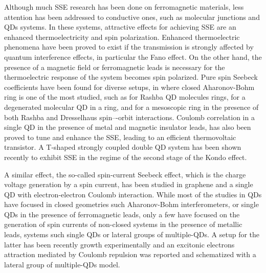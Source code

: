 \documentclass[aps,twocolumn,prb,superscript,floatfix,superscriptaddress,showpacs]{revtex4-1}
\begin{document}
Although much SSE research has been done on ferromagnetic materials, less attention has been addressed to conductive ones, such as molecular junctions and QDs systems.\cite{Karwacki2016,Sierra2016} In these systems, attractive effects for achieving SSE are an enhanced thermoelectricity and spin polarization. Enhanced thermoelectric phenomena have been proved to exist if the transmission is strongly affected by quantum interference effects,\cite{Bergfield2009,Finch2009,Stadler2011,GomezSilva2012,Lambert2015} in particular the Fano effect.\cite{Miroshnichenko2010} On the other hand, the presence of a magnetic field or ferromagnetic leads is necessary for the thermoelectric response of the system becomes spin polarized. Pure spin Seebeck coefficients have been found for diverse setups, in where closed Aharonov-Bohm ring is one of the most studied, such as for Rashba QD molecules rings, \cite{Liu2011,gomez2014} for a degenerated molecular QD in a ring,\cite{Jiang2015} and for a mesoscopic ring in the presence of both Rashba and Dresselhaus spin–-orbit interactions.\cite{Liu2016} Coulomb correlation in a single QD in the presence of metal and magnetic insulator leads, has also been proved to tune and enhance the SSE, leading to an efficient thermovoltaic transistor.\cite{Lei2016} A T-shaped strongly coupled double QD system has been shown recently to exhibit SSE in the regime of the second stage of the Kondo effect.\cite{Krzysztof2016}

A similar effect, the so-called spin-current Seebeck effect, which is the charge voltage generation by a spin current, has been studied in graphene\cite{VeraMarun2012} and a single QD with electron-electron Coulomb interaction.\cite{Yang2014,Ramos2015} While most of the studies in QDs have focused in closed geometries such Aharonov-Bohm interferometers,\cite{Liu2011,gomez2014,Jiang2015} or single QDs in the presence of ferromagnetic leads,\cite{Krzysztof2016,Hwang2016} only a few have focused on the generation of spin currents of non-closed systems in the presence of metallic leads, systems such single QDs\cite{Dong2015} or lateral groups of multiple-QDs. A setup for the latter has been recently growth experimentally and an excitonic electrons attraction mediated by Coulomb repulsion was reported and schematized with a lateral group of multiple-QDs model.\cite{Hamo2016}
\end{document}
